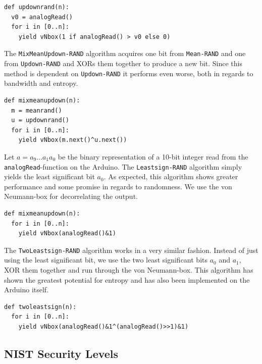 \documentclass[a4paper]{article}           %
\begin{document}
\begin{lstlisting}[caption=The \texttt{Updown-RAND} algorithm]
def updownrand(n):
  v0 = analogRead()
  for i in [0..n]:
    yield vNbox(1 if analogRead() > v0 else 0)
\end{lstlisting}

The \texttt{MixMeanUpdown-RAND} algorithm acquires one bit from \texttt{Mean-RAND} and one from \texttt{Updown-RAND} and XORs them together to produce a new bit. Since this method is dependent on \texttt{Updown-RAND} it performs even worse, both in regards to bandwidth and entropy. 

\begin{lstlisting}[caption=The \texttt{MixMeanUpdown-RAND} algorithm]
def mixmeanupdown(n):
  m = meanrand()
  u = updownrand()
  for i in [0..n]:
    yield vNbox(m.next()^u.next())
\end{lstlisting}

Let $a = a_9 \ldots a_1a_0$ be the binary representation of a 10-bit integer read from the \texttt{analogRead}-function on the Arduino. The \texttt{Leastsign-RAND} algorithm simply yields the least significant bit $a_0$. As expected, this algorithm shows greater performance and some promise in regards to randomness. We use the von Neumann-box for decorrelating the output. 

\begin{lstlisting}[caption=The \texttt{Leastsign-RAND} algorithm]
def mixmeanupdown(n):
  for i in [0..n]:
    yield vNbox(analogRead()&1)
\end{lstlisting}

The \texttt{TwoLeastsign-RAND} algorithm works in a very similar fashion. Instead of just using the least significant bit, we use the two least significant bits $a_0$ and $a_1$, XOR them together and run through the von Neumann-box. This algorithm has shown the greatest potential for entropy and has also been implemented on the Arduino itself.

\begin{lstlisting}[caption=The \texttt{TwoLeastsign-RAND} algorithm]
def twoleastsign(n):
  for i in [0..n]:
    yield vNbox(analogRead()&1^(analogRead()>>1)&1)
\end{lstlisting}



\subsection{NIST Security Levels}
\end{document}
